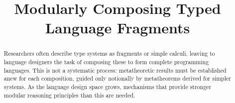 \documentclass[10pt,preprint]{sigplanconf}
\begin{document}
\conferenceinfo{-}{-} 
\copyrightyear{-} 
\copyrightdata{[to be supplied]} 


\title{Modularly Composing Typed Language Fragments}

\authorinfo{}{}{}

\maketitle
\begin{abstract}
Researchers often describe type systems as fragments or simple calculi, leaving to language designers the task of composing these to form complete programming  languages.  %
This is not a systematic process: metatheoretic results must be established anew for each composition, guided only notionally by metatheorems derived for simpler systems.
As the language design space grows, mechanisms that provide stronger modular reasoning principles than this are needed.%



\end{abstract}
\end{document}

